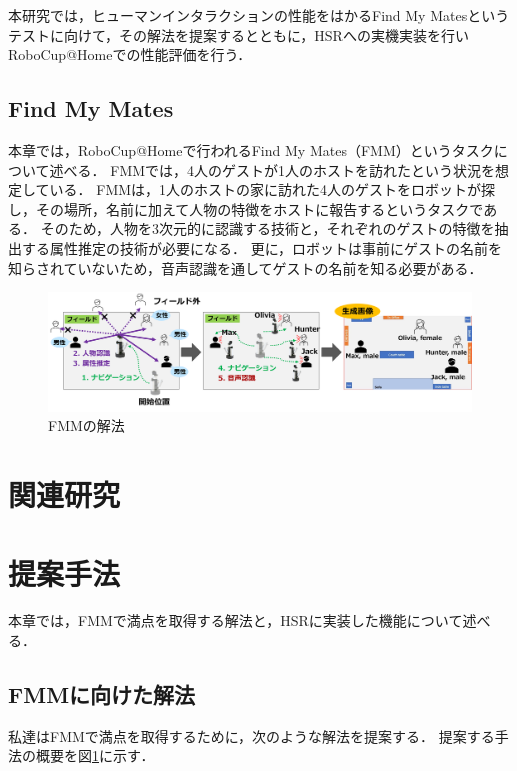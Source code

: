 \documentclass[a4j]{jarticle}
\begin{document}
本研究では，ヒューマンインタラクションの性能をはかるFind My Matesというテストに向けて，その解法を提案するとともに，HSRへの実機実装を行いRoboCup@Homeでの性能評価を行う．

\subsection{Find My Mates}
本章では，RoboCup@Homeで行われるFind My Mates（FMM）というタスクについて述べる．
FMMでは，4人のゲストが1人のホストを訪れたという状況を想定している．
FMMは，1人のホストの家に訪れた4人のゲストをロボットが探し，その場所，名前に加えて人物の特徴をホストに報告するというタスクである．
そのため，人物を3次元的に認識する技術と，それぞれのゲストの特徴を抽出する属性推定の技術が必要になる．
更に，ロボットは事前にゲストの名前を知らされていないため，音声認識を通してゲストの名前を知る必要がある．
\begin{figure}[ht]
  \centering
  \includegraphics[width=16cm]{images/FMM/solution_overview_yoko_yy2.png}
  \caption{FMMの解法}
  \label{solution_overview}
\end{figure}

\section{関連研究}


\section{提案手法}
本章では，FMMで満点を取得する解法と，HSRに実装した機能について述べる．

\subsection{FMMに向けた解法}
私達はFMMで満点を取得するために，次のような解法を提案する．
提案する手法の概要を図\ref{solution_overview}に示す．
\end{document}

